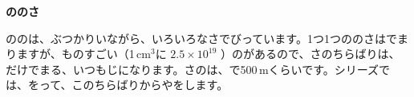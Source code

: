 \begin{butsuri}
\par\addvspace{3pt}\textbf{ののさ}\par
\noindent {}ののは、ぶつかりいながら、いろいろなさでびっています。1つ1つののさはでまりますが、ものすごい（1\,cm$^3$に $2.5\times10^{19}$ ）のがあるので、さのちらばりは、だけでまる、いつもじになります。さのは、で500\,mくらいです。シリーズでは、をって、このちらばりからやをします。


\end{butsuri}
